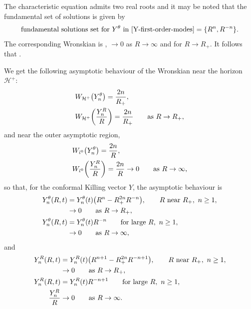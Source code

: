 \documentclass[11pt]{article}
\numberwithin{equation}{section}
\numberwithin{equation}{section}
\begin{document}
The characteristic equation admits two real roots and it may be noted that the fundamental set of solutions is given by
\begin{align*}
 \text{fundamental solutions set for $Y^\theta$ in \eqref{Y-first-order-modes}} = \{ R^n, R^{-n} \}.
\end{align*}
The corresponding Wronskian is , $\to 0$ as $R \to \infty$ and  for $R \to R_+$. It follows that .

We get the following asymptotic behaviour of the Wronskian near the horizon $\mathcal{H}^{+}$:
\begin{align*}
&W_{\mathcal{H}^+} \bigl(Y_n^\theta\bigr)= \frac{2n}{R_+}, \notag\\
&W_{\mathcal{H}^+} \biggl(\frac{Y_n^R}{R}\biggr)= \frac{2n}{R_+} \qquad \text{as} \ R \to R_+,
\end{align*}
and near the outer asymptotic region,
\begin{align*}
&W_{\bar{\iota}^0} \bigl(Y_n^\theta\bigr)= \frac{2n}{R}, \notag\\
&W_{\bar{\iota}^0} \biggl(\frac{Y_n^R}{R}\biggr)= \frac{2n}{R} \to 0 \qquad \text{as} \ R \to \infty,
\end{align*}
so that, for the conformal Killing vector $Y$, the asymptotic behaviour is
\begin{subequations} \label{Y-theta-asym}
\begin{align}
	Y_n^ \theta (R, t)&{}= Y_n^\theta (t) \bigl(R^n - R^{2n}_+ R^{-n}\bigr), \qquad R \ \text{near} \ R_+, \ n \geq 1, \notag \\
	&{} \to 0 \qquad \text{as} \ R \to R_+, \\
	Y_n^\theta (R, t)&= Y_n^\theta (t) R^{-n} \qquad \text{for large} \ R, \ n \geq 1, \notag\\
	&{} \to 0 \qquad \text{as} \ R \to \infty,
\end{align}
\end{subequations}
and
\begin{subequations} \label{Y-R-asym}
	\begin{align}
	Y_n^ R (R, t)&{}= Y_n^R (t) \bigl(R^{n+1} - R^{2n}_+ R^{-n+1}\bigr), \qquad R \ \text{near} \ R_+, \ n \geq 1, \notag \\
	&{} \to 0 \qquad \text{as} \ R \to R_+ ,\\
	Y_n^R (R, t)&= Y_n^R (t) R^{-n+1} \qquad \text{for large} \ R, \ n \geq 1, \notag\\
\frac{Y_n^R}{R}	 &{}\to 0 \qquad \text{as} \ R \to \infty.
	\end{align}
\end{subequations}
\end{document}
